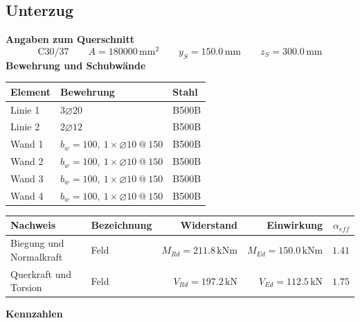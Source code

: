 \documentclass[11pt,a4paper]{article}
\begin{document}
\subsection{Unterzug}
\noindent\textbf{Angaben zum Querschnitt}
\begin{equation*}
\text{C30/37} \qquad A = 180000\,\mathrm{mm}^2 \qquad y_S = 150.0\,\mathrm{mm} \qquad z_S = 300.0\,\mathrm{mm}
\end{equation*}
\noindent\textbf{Bewehrung und Schubwände}
\begin{longtable}{lll}
\hline
Element & Bewehrung & Stahl \\
\hline
\endhead
Linie 1 & $3 \varnothing 20$ & B500B \\
Linie 2 & $2 \varnothing 12$ & B500B \\
Wand 1 & $b_w = 100,\ 1 \times \varnothing 10\ @\ 150$ & B500B \\
Wand 2 & $b_w = 100,\ 1 \times \varnothing 10\ @\ 150$ & B500B \\
Wand 3 & $b_w = 100,\ 1 \times \varnothing 10\ @\ 150$ & B500B \\
Wand 4 & $b_w = 100,\ 1 \times \varnothing 10\ @\ 150$ & B500B \\
\hline
\end{longtable}
\begin{xltabular}{\linewidth}{>{\raggedright\arraybackslash}X>{\raggedright\arraybackslash}Xrrr}
\hline
Nachweis & Bezeichnung & Widerstand & Einwirkung & $\alpha_{eff}$ \\
\hline
\endhead
Biegung und Normalkraft & Feld & $M_{Rd} = 211.8\,\mathrm{kNm}$ & $M_{Ed} = 150.0\,\mathrm{kNm}$ & $1.41$ \\
Querkraft und Torsion & Feld & $V_{Rd} = 197.2\,\mathrm{kN}$ & $V_{Ed} = 112.5\,\mathrm{kN}$ & $1.75$ \\
\hline
\end{xltabular}
\noindent\textbf{Kennzahlen}
\end{document}
